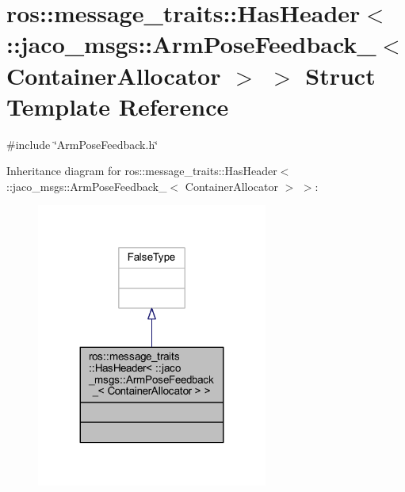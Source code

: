 \hypertarget{structros_1_1message__traits_1_1HasHeader_3_01_1_1jaco__msgs_1_1ArmPoseFeedback___3_01ContainerAllocator_01_4_01_4}{}\section{ros\+:\+:message\+\_\+traits\+:\+:Has\+Header$<$ \+:\+:jaco\+\_\+msgs\+:\+:Arm\+Pose\+Feedback\+\_\+$<$ Container\+Allocator $>$ $>$ Struct Template Reference}
\label{structros_1_1message__traits_1_1HasHeader_3_01_1_1jaco__msgs_1_1ArmPoseFeedback___3_01ContainerAllocator_01_4_01_4}


{\ttfamily \#include \char`\"{}Arm\+Pose\+Feedback.\+h\char`\"{}}



Inheritance diagram for ros\+:\+:message\+\_\+traits\+:\+:Has\+Header$<$ \+:\+:jaco\+\_\+msgs\+:\+:Arm\+Pose\+Feedback\+\_\+$<$ Container\+Allocator $>$ $>$\+:
\nopagebreak
\begin{figure}[H]
\begin{center}
\leavevmode
\includegraphics[width=215pt]{d5/d45/structros_1_1message__traits_1_1HasHeader_3_01_1_1jaco__msgs_1_1ArmPoseFeedback___3_01ContainerA877181f757907dc1d6c37f935bf54310}
\end{center}
\end{figure}



